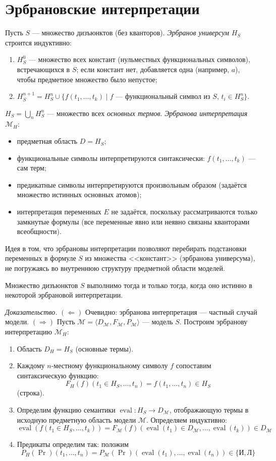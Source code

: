 \documentclass[10pt]{article}
\begin{document}
\section{Эрбрановские интерпретации}
Пусть $S$ — множество дизъюнктов (без кванторов). 
\textit{Эрбранов универсум} $H_S$ строится индуктивно:
\begin{enumerate}
  \item $H_S^0$ — множество всех констант (нульместных функциональных символов), встречающихся в $S$; если констант нет, добавляется одна (например, $a$), чтобы предметное множество было непустое;
  \item $H_S^{n+1}=H_S^n\cup\{f(t_1,\dots,t_k)\mid f$ — функциональный символ из $S$, $t_i\in H_S^n\}$.
\end{enumerate}
$H_S=\bigcup_n H_S^n$ — множество всех \textit{основных термов}.
\textit{Эрбранова интерпретация} $\mathcal{M}_H$:
\begin{itemize}
  \item предметная область $D=H_S$;
  \item функциональные символы интерпретируются синтаксически: $f(t_1,\dots,t_k)$ — сам терм;
  \item предикатные символы интерпретируются произвольным образом (задаётся множество истинных основных атомов);
  \item интерпретация переменных $E$ не задаётся, поскольку рассматриваются только замкнутые формулы (все переменные явно или неявно связаны кванторами всеобщности).
\end{itemize}
Идея в том, что эрбрановы интерпретации позволяют перебирать подстановки переменных в формуле $S$ из множества <<констант>> (эрбранова универсума), не погружаясь во внутреннюю структуру предметной области моделей.
\begin{theorem}
Множество дизъюнктов $S$ выполнимо тогда и только тогда, когда оно истинно в некоторой эрбрановой интерпретации.
\end{theorem}
\textit{Доказательство.} $(\Leftarrow)$ Очевидно: эрбранова интерпретация — частный случай модели.  
$(\Rightarrow)$ Пусть $\mathcal{M}=\langle D_\mathcal{M},F_\mathcal{M},P_\mathcal{M}\rangle$ — модель $S$. Построим эрбранову интерпретацию $\mathcal{M}_H$:
\begin{enumerate}
  \item Область $D_H=H_S$ (основные термы).
  \item Каждому $n$-местному функциональному символу $f$ сопоставим синтаксическую функцию: $$F_H(f)(t_1 \in H_S,\dots,t_n)=f(t_1,\dots,t_n) \in H_S$$ (строка).
  \item Определим функцию семантики $\operatorname{eval} : H_S \rightarrow D_\mathcal{M}$, отображающую термы в исходную предметную область модели $\mathcal{M}$. Определяем индуктивно: $$\operatorname{eval}(f(t_1 \in H_S,\dots,t_k))=F_\mathcal{M}(f)(\operatorname{eval}(t_1) \in D_\mathcal{M},\dots,\operatorname{eval}(t_k)) \in D_\mathcal{M}$$
  \item Предикаты определим так: положим $$P_H(\operatorname{Pr})(t_1,\dots,t_n)=P_\mathcal{M}(\operatorname{Pr})(\operatorname{eval}(t_1),\dots,\operatorname{eval}(t_n)) \in \{\text{И}, \text{Л}\}$$
\end{enumerate}
\end{document}
